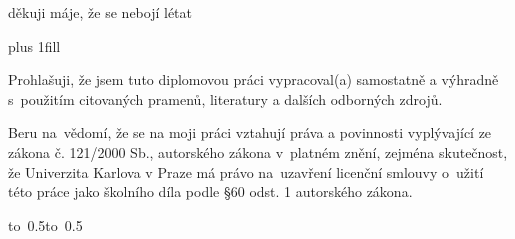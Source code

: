 \documentclass[12pt,a4paper]{report}
\let\openright=\clearpage
\begin{document}
\newpage



\openright

\noindent
děkuji máje, že se nebojí létat

\newpage


\vglue 0pt plus 1fill

\noindent
Prohlašuji, že jsem tuto diplomovou práci vypracoval(a) samostatně a výhradně
s~použitím citovaných pramenů, literatury a dalších odborných zdrojů.

\medskip\noindent
Beru na~vědomí, že se na moji práci vztahují práva a povinnosti vyplývající
ze zákona č. 121/2000 Sb., autorského zákona v~platném znění, zejména skutečnost,
že Univerzita Karlova v Praze má právo na~uzavření licenční smlouvy o~užití této
práce jako školního díla podle §60 odst. 1 autorského zákona.

\vspace{10mm}

\hbox{\hbox to 0.5\hbox to 0.5}

\vspace{20mm}
\newpage

\end{document}
